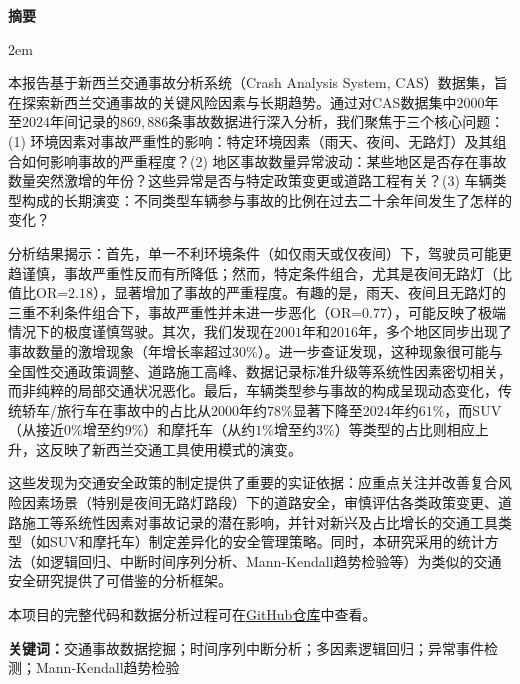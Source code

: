 \documentclass[12pt,a4paper]{article}
\newenvironment{cnabstract}{
    \par\small
    \noindent\mbox{}\par\vspace{-\baselineskip}
    \par\songti\parindent 2em
    }
    {\par\vspace{1em}}
\begin{document}
\clearpage
{}
\begin{center}{\songti\bfseries{摘\quad 要}}\end{center}\par\vspace{0.5em}
\begin{cnabstract}
本报告基于新西兰交通事故分析系统（Crash Analysis System, CAS）数据集，旨在探索新西兰交通事故的关键风险因素与长期趋势。通过对CAS数据集中$2000$年至$2024$年间记录的$869,886$条事故数据进行深入分析，我们聚焦于三个核心问题：(1) 环境因素对事故严重性的影响：特定环境因素（雨天、夜间、无路灯）及其组合如何影响事故的严重程度？(2) 地区事故数量异常波动：某些地区是否存在事故数量突然激增的年份？这些异常是否与特定政策变更或道路工程有关？(3) 车辆类型构成的长期演变：不同类型车辆参与事故的比例在过去二十余年间发生了怎样的变化？

分析结果揭示：首先，单一不利环境条件（如仅雨天或仅夜间）下，驾驶员可能更趋谨慎，事故严重性反而有所降低；然而，特定条件组合，尤其是夜间无路灯（比值比OR=$2.18$），显著增加了事故的严重程度。有趣的是，雨天、夜间且无路灯的三重不利条件组合下，事故严重性并未进一步恶化（OR=$0.77$），可能反映了极端情况下的极度谨慎驾驶。其次，我们发现在$2001$年和$2016$年，多个地区同步出现了事故数量的激增现象（年增长率超过$30\%$）。进一步查证发现，这种现象很可能与全国性交通政策调整、道路施工高峰、数据记录标准升级等系统性因素密切相关，而非纯粹的局部交通状况恶化。最后，车辆类型参与事故的构成呈现动态变化，传统轿车/旅行车在事故中的占比从$2000$年约$78\%$显著下降至$2024$年约$61\%$，而SUV（从接近$0\%$增至约$9\%$）和摩托车（从约$1\%$增至约$3\%$）等类型的占比则相应上升，这反映了新西兰交通工具使用模式的演变。

这些发现为交通安全政策的制定提供了重要的实证依据：应重点关注并改善复合风险因素场景（特别是夜间无路灯路段）下的道路安全，审慎评估各类政策变更、道路施工等系统性因素对事故记录的潜在影响，并针对新兴及占比增长的交通工具类型（如SUV和摩托车）制定差异化的安全管理策略。同时，本研究采用的统计方法（如逻辑回归、中断时间序列分析、Mann-Kendall趋势检验等）为类似的交通安全研究提供了可借鉴的分析框架。

本项目的完整代码和数据分析过程可在\href{https://github.com/Frederick2313072/kagglenewzealand}{GitHub仓库}中查看。

\vspace{1em}
\noindent\textbf{关键词：}交通事故数据挖掘；时间序列中断分析；多因素逻辑回归；异常事件检测；Mann-Kendall趋势检验
\end{cnabstract}
\end{document}
